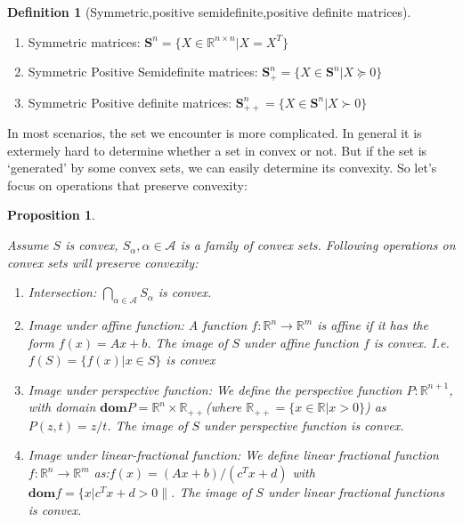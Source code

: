 \documentclass[
]{book}
\providecommand{\tightlist}{%
  \setlength{\itemsep}{0pt}\setlength{\parskip}{0pt}}
\newtheorem{proposition}{Proposition}[chapter]
\theoremstyle{definition}
\newtheorem{definition}{Definition}[chapter]
\theoremstyle{definition}
\theoremstyle{definition}
\theoremstyle{definition}
\theoremstyle{remark}
\begin{document}
\begin{definition}[Symmetric,positive semidefinite,positive definite matrices]
\protect\hypertarget{def:symmetricmatrices}{}\label{def:symmetricmatrices}\leavevmode

\begin{enumerate}
\def\labelenumi{\arabic{enumi}.}
\tightlist
\item
  Symmetric matrices: \(\textbf{S}^n = \{X\in\mathbb{R}^{n\times n}| X=X^T\}\)
\item
  Symmetric Positive Semidefinite matrices: \(\textbf{S}_+^n = \{X\in\textbf{S}^n| X\succeq0\}\)
\item
  Symmetric Positive definite matrices: \(\textbf{S}_{++}^n = \{X\in\textbf{S}^n| X\succ0\}\)
\end{enumerate}

\end{definition}

In most scenarios, the set we encounter is more complicated. In general it is extermely hard to determine whether a set in convex or not. But if the set is `generated' by some convex sets, we can easily determine its convexity. So let's focus on operations that preserve convexity:

\begin{proposition}
\protect\hypertarget{prp:operationpreserveconvexity}{}\label{prp:operationpreserveconvexity}

Assume \(S\) is convex, \(S_\alpha,\alpha\in\mathcal{A}\) is a family of convex sets. Following operations on convex sets will preserve convexity:

\begin{enumerate}
\def\labelenumi{\arabic{enumi}.}
\item
  Intersection: \(\bigcap_{\alpha\in\mathcal{A}}S_\alpha\) is convex.
\item
  Image under affine function: A function \(f:\mathbb{R}^n\to\mathbb{R}^m\) is affine if it has the form \(f(x) = Ax+b\). The image of \(S\) under affine function \(f\) is convex. I.e. \(f(S) = \{f(x)|x\in S\}\) is convex
\item
  Image under perspective function: We define the perspective function \(P:\mathbb{R}^{n+1}\), with domain \(\textbf{dom}P = \mathbb{R}^n\times \mathbb{R}_{++}\)(where \(\mathbb{R}_{++}=\{x\in \mathbb{R}|x>0\}\)) as \(P(z,t) = z/t\). The image of \(S\) under perspective function is convex.
\item
  Image under linear-fractional function: We define linear fractional function \(f:\mathbb{R}^n\to\mathbb{R}^m\) as:\(f(x) = (Ax+b)/(c^Tx+d)\) with \(\textbf{dom}f = \{x|c^Tx+d>0\|\). The image of \(S\) under linear fractional functions is convex.
\end{enumerate}

\end{proposition}
\end{document}
